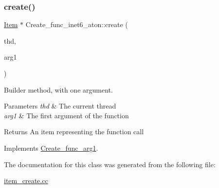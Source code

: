 \subsubsection{\texorpdfstring{create()}{create()}}
{\footnotesize\ttfamily \mbox{\hyperlink{classItem}{Item}} $\ast$ Create\+\_\+func\+\_\+inet6\+\_\+aton\+::create (\begin{DoxyParamCaption}\item[{T\+HD $\ast$}]{thd,  }\item[{\mbox{\hyperlink{classItem}{Item}} $\ast$}]{arg1 }\end{DoxyParamCaption})\hspace{0.3cm}{\ttfamily [virtual]}}

Builder method, with one argument. 
\begin{DoxyParams}{Parameters}
{\em thd} & The current thread \\
\hline
{\em arg1} & The first argument of the function \\
\hline
\end{DoxyParams}
\begin{DoxyReturn}{Returns}
An item representing the function call 
\end{DoxyReturn}


Implements \mbox{\hyperlink{classCreate__func__arg1_a3e9a98f755cd82c3e762e334c955a8c9}{Create\+\_\+func\+\_\+arg1}}.



The documentation for this class was generated from the following file\+:\begin{DoxyCompactItemize}
\item 
\mbox{\hyperlink{item__create_8cc}{item\+\_\+create.\+cc}}\end{DoxyCompactItemize}
